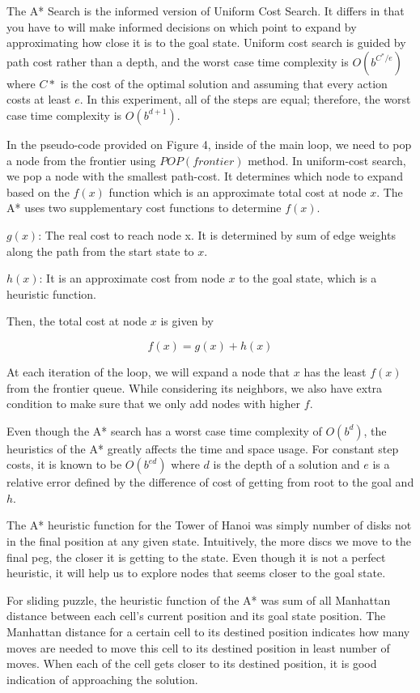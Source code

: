 \documentclass[conference]{IEEEtran}
\begin{document}
The A* Search is the informed version of Uniform Cost Search. It differs in that you have to will make informed decisions on which point to expand by approximating how close it is to the goal state. Uniform cost search is guided by path cost rather than a depth, and the worst case time complexity is $O(b^{C^*/e})$ where $C*$ is the cost of the optimal solution and assuming that every action costs at least $e$. In this experiment, all of the steps are equal; therefore, the worst case time complexity is $O(b^{d+1})$.

In the pseudo-code provided on Figure 4, inside of the main loop, we need to pop a node from the frontier using $POP(frontier)$ method. In uniform-cost search, we pop a node with the smallest path-cost. It determines which node to expand based on the $f(x)$ function which is an approximate total cost at node $x$. The A* uses two supplementary cost functions to determine $f(x)$.

$g(x)$: The real cost to reach node x. It is determined by sum of edge weights along the path from the start state to $x$.

$h(x)$: It is an approximate cost from node $x$ to the goal state, which is a heuristic function.

Then, the total cost at node $x$ is given by

\begin{equation}
    f(x) = g(x) + h(x)
\end{equation}

At each iteration of the loop, we will expand a node that $x$ has the least $f(x)$ from the frontier queue. While considering its neighbors, we also have extra condition to make sure that we only add nodes with higher $f$.

Even though the A* search has a worst case time complexity of $O(b^d)$, the heuristics of the A* greatly affects the time and space usage. For constant step costs, it is known to be $O(b^{ed})$ where $d$ is the depth of a solution and $e$ is a relative error defined by the difference of cost of getting from root to the goal and $h$.

The A* heuristic function for the Tower of Hanoi was simply number of disks not in the final position at any given state. Intuitively, the more discs we move to the final peg, the closer it is getting to the state. Even though it is not a perfect heuristic, it will help us to explore nodes that seems closer to the goal state.

For sliding puzzle, the heuristic function of the A* was sum of all Manhattan distance between each cell's current position and its goal state position. The Manhattan distance for a certain cell to its destined position indicates how many moves are needed to move this cell to its destined position in least number of moves. When each of the cell gets closer to its destined position, it is good indication of approaching the solution. 
\end{document}
